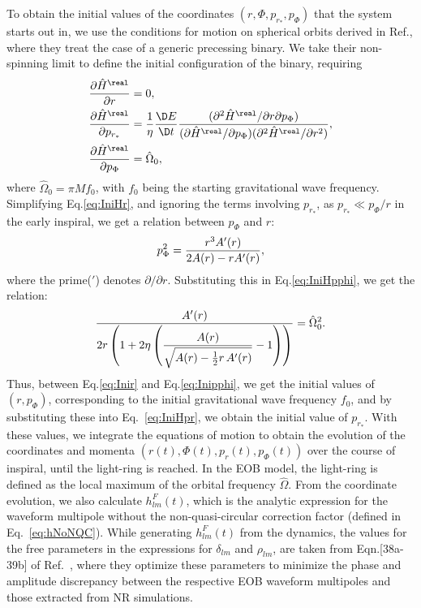 To obtain the initial values of the coordinates $(r,\Phi,p_{r_*},p_{\Phi})$ that the
system starts out in, we use the conditions for motion on spherical orbits derived in
Ref.\cite{Buonanno:2005xu}, where they treat the case of a generic precessing binary.
We take their non-spinning limit to define the initial configuration of the binary, requiring
\begin{subequations}
\begin{align}\label{eq:IniHr}
\dfrac{\partial\hat{H}^{\real}}{\partial r} &= 0,\\ \label{eq:IniHpr}
\dfrac{\partial\hat{H}^{\real}}{\partial p_{r_*}} &= \dfrac{1}{\eta}\dfrac{\D E}{\D t}\dfrac{(\partial^2\hat{H}^{\real}/\partial r\partial p_{\Phi} )}{(\partial\hat{H}^{\real}/\partial p_{\Phi})(\partial^2\hat{H}^{\real}/\partial r^2)}, \\\label{eq:IniHpphi}
\dfrac{\partial\hat{H}^{\real}}{\partial p_{\Phi}} &= \hat{\Omega}_0,
\end{align}
\end{subequations}
where $\hat{\Omega}_0 = \pi Mf_0$, with $f_0$ being the starting gravitational wave frequency. Simplifying Eq.\eqref{eq:IniHr}, and ignoring the terms involving $p_{r_*}$, as $p_{r_*}\ll p_{\Phi}/r$ in the early inspiral, we get a relation between $p_{\Phi}$ and $r$:
\begin{equation}
p_{\Phi}^2 = \dfrac{r^3A'(r)}{2A(r) - rA'(r)} \\ \label{eq:Inipphi},
\end{equation}
where the prime($'$) denotes $\partial/\partial r$. Substituting this in Eq.\eqref{eq:IniHpphi}, we get the relation:
\begin{equation}
\dfrac{A'(r)}{2r\left(1 + 2\eta\left(\dfrac{A(r)}{\sqrt{A(r)-\frac{1}{2}r\,A'(r)}} - 1\right)\right)} = \hat{\Omega}_0^2.\\ \label{eq:Inir}
\end{equation} 
Thus, between Eq.\eqref{eq:Inir} and Eq.\eqref{eq:Inipphi}, we get the initial values 
of $(r, p_{\Phi})$, corresponding to the initial gravitational wave frequency $f_0$,
and by substituting these into Eq.~\ref{eq:IniHpr}, we obtain the initial value 
of $p_{r_*}$.
With these values, we integrate the equations of motion to obtain the evolution 
of the coordinates and momenta $(r(t),\Phi(t),p_r(t),p_{\Phi}(t))$ over the 
course of inspiral, until the light-ring is reached. In the EOB model, the 
light-ring is defined as the local maximum of the orbital frequency 
$\hat{\Omega}$. From the coordinate evolution, we also calculate $h^F_{lm}(t)$,
which is the analytic expression
for the waveform multipole without the non-quasi-circular correction factor
(defined in Eq.~\eqref{eq:hNoNQC}). While generating $h^F_{lm}(t)$ from the
dynamics, the values for the free parameters in the expressions for
$\delta_{lm}$ and $\rho_{lm}$, are taken from Eqn.[38a-39b] of
Ref.~\citep{BuonannoEOBv2Main}, where they optimize these parameters to
minimize the phase and amplitude discrepancy between the respective EOB
waveform multipoles and those extracted from NR simulations.

